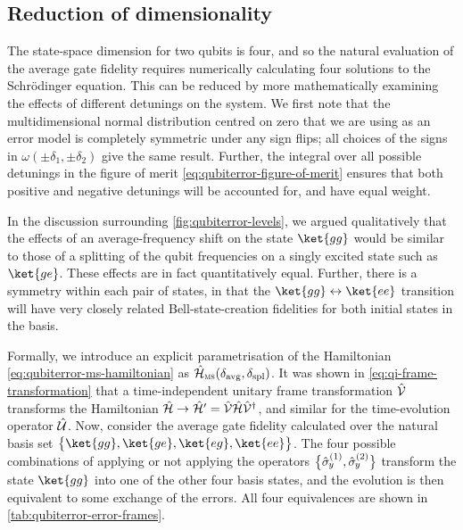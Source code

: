 \subsection{Reduction of dimensionality}
\label{sec:qubiterror-dimensionality}

The state-space dimension for two qubits is four, and so the natural evaluation of the average gate fidelity requires numerically calculating four solutions to the Schr\"odinger equation.
This can be reduced by more mathematically examining the effects of different detunings on the system.
We first note that the multidimensional normal distribution centred on zero that we are using as an error model is completely symmetric under any sign flips; all choices of the signs in $\omega(\pm\delta_1,\pm\delta_2)$ give the same result.
Further, the integral over all possible detunings in the figure of merit \cref{eq:qubiterror-figure-of-merit} ensures that both positive and negative detunings will be accounted for, and have equal weight.

In the discussion surrounding \cref{fig:qubiterror-levels}, we argued qualitatively that the effects of an average-frequency shift on the state $\ket{gg}$ would be similar to those of a splitting of the qubit frequencies on a singly excited state such as $\ket{ge}$.
These effects are in fact quantitatively equal.
Further, there is a symmetry within each pair of states, in that the $\ket{gg}\leftrightarrow\ket{ee}$ transition will have very closely related Bell-state-creation fidelities for both initial states in the basis.

Formally, we introduce an explicit parametrisation of the Hamiltonian \cref{eq:qubiterror-ms-hamiltonian} as $\hat{\mathcal H}_{\textsc{ms}}(\delta_{\text{avg}}, \delta_{\text{spl}})$.
It was shown in \cref{eq:qi-frame-transformation} that a time-independent unitary frame transformation $\hat{\mathcal V}$ transforms the Hamiltonian $\hat{\mathcal H}\to\hat{\mathcal H}'=\hat{\mathcal V}\hat{\mathcal H}\hat{\mathcal V}^\dagger$, and similar for the time-evolution operator $\hat{\mathcal U}$.
Now, consider the average gate fidelity calculated over the natural basis set $\bigl\{\ket{gg},\ket{ge},\ket{eg},\ket{ee}\bigr\}$.
The four possible combinations of applying or not applying the operators $\bigl\{\hat{\sigma}_{\mkern-1mu y}^{(1)},\hat{\sigma}_{\mkern-1mu y}^{(2)}\bigr\}$ transform the state $\ket{gg}$ into one of the other four basis states, and the evolution is then equivalent to some exchange of the errors.
All four equivalences are shown in \cref{tab:qubiterror-error-frames}.

